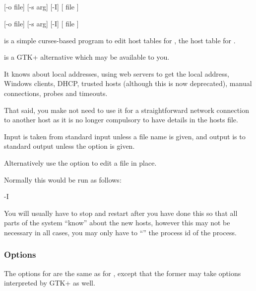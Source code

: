 \subsection{\HosteditName}

\begin{expara}

\HosteditName{} [-o file] [-s arg] [-I] [ file ]

\XhosteditName{} [-o file] [-s arg] [-I] [ file ]

\end{expara}

\PrHostedit{} is a simple curses-based program to edit host tables for \hostsfile, the host table for \ProductName{}.

\PrXhostedit{} is a GTK+ alternative which may be available to you.

It knows about local addresses, using web servers to get the local address, Windows clients,
DHCP, trusted hosts (although this is now deprecated), manual connections, probes and timeouts.

That said, you make not need to use it for a straightforward network connection to another host as
it is no longer compulsory to have details in the hosts file.

Input is taken from standard input unless a file name is given, and output is to standard output unless the 
option is given.

Alternatively use the  option to edit a file in place.

Normally this would be run as follows:

\begin{expara}

\HosteditName{} -I \hostsfilename

\end{expara}

You will usually have to stop and restart \ProductName{} after you have done this so that all parts of the system ``know''
about the new hosts, however this may not be necessary in all cases, you may only have to ``'' the process id of the
 process.

\subsubsection{Options}

The options for  are the same as for \PrHostedit{}, except that the former may take options interpreted by GTK+ as well.

